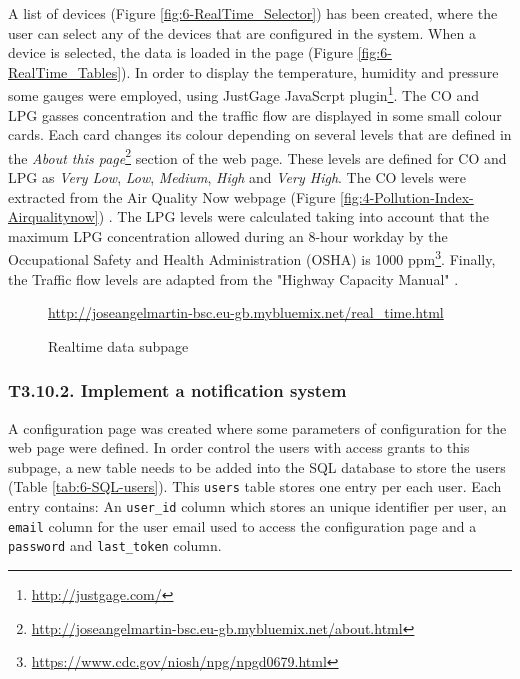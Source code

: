 A list of devices (Figure \ref{fig:6-RealTime_Selector}) has been created, where the user can select any of the devices that are configured in the system. When a device is selected, the data is loaded in the page (Figure \ref{fig:6-RealTime_Tables}). In order to display the temperature, humidity and pressure some gauges were employed, using JustGage JavaScrpt plugin\footnote{\url{http://justgage.com/}}. The CO and LPG gasses concentration and the traffic flow are displayed in some small colour cards. Each card changes its colour depending on several levels that are defined in the \textit{About this page}\footnote{\url{http://joseangelmartin-bsc.eu-gb.mybluemix.net/about.html}} section of the web page. These levels are defined for CO and LPG as \textit{Very Low}, \textit{Low}, \textit{Medium}, \textit{High} and \textit{Very High}. The CO levels were extracted from the Air Quality Now webpage (Figure \ref{fig:4-Pollution-Index-Airqualitynow}) \cite{airqualitynow}. The LPG levels were calculated taking into account that the maximum LPG concentration allowed during an 8-hour workday by the Occupational Safety and Health Administration (OSHA) is 1000 ppm\footnote{\url{https://www.cdc.gov/niosh/npg/npgd0679.html}}. Finally, the Traffic flow levels are adapted from the "Highway Capacity Manual" \cite{HCM2000}.

\begin{figure}[htb]
	\centering
	\caption{Realtime data subpage}
	\label{fig:6-RealTime}{\url{http://joseangelmartin-bsc.eu-gb.mybluemix.net/real_time.html}}
\end{figure}


\subsubsection{T3.10.2. Implement a notification system}
A configuration page was created where some parameters of configuration for the web page were defined. In order control the users with access grants to this subpage, a new table needs to be added into the SQL database to store the users (Table \ref{tab:6-SQL-users}). This \texttt{users} table stores one entry per each user. Each entry contains: An \texttt{user\_id} column which stores an unique identifier per user, an \texttt{email} column for the user email used to access the configuration page and a \texttt{password} and \texttt{last\_token} column.

